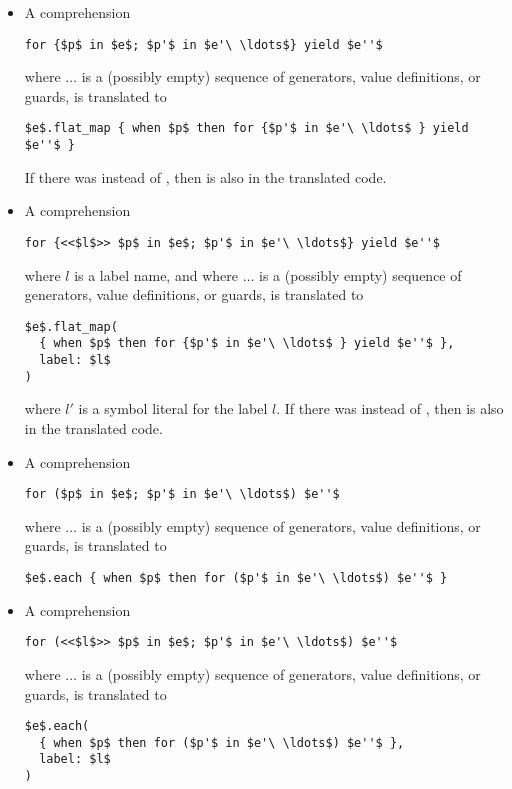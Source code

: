 \begin{itemize}
\item A comprehension 
\begin{lstlisting}
for {$p$ in $e$; $p'$ in $e'\ \ldots$} yield $e''$
\end{lstlisting}
where $\ldots$ is a (possibly empty) sequence of generators, value definitions, or guards, is translated to
\begin{lstlisting}
$e$.flat_map { when $p$ then for {$p'$ in $e'\ \ldots$ } yield $e''$ }
\end{lstlisting}
If there was  instead of , then  is also in the translated code. 

\item A comprehension 
\begin{lstlisting}
for {<<$l$>> $p$ in $e$; $p'$ in $e'\ \ldots$} yield $e''$
\end{lstlisting}
where $l$ is a label name, and where $\ldots$ is a (possibly empty) sequence of generators, value definitions, or guards, is translated to
\begin{lstlisting}[deletekeywords={label}]
$e$.flat_map(
  { when $p$ then for {$p'$ in $e'\ \ldots$ } yield $e''$ },
  label: $l$
)
\end{lstlisting}
where $l'$ is a symbol literal for the label $l$. If there was  instead of , then  is also in the translated code. 

\item A comprehension 
\begin{lstlisting}
for ($p$ in $e$; $p'$ in $e'\ \ldots$) $e''$
\end{lstlisting}
where $\ldots$ is a (possibly empty) sequence of generators, value definitions, or guards, is translated to
\begin{lstlisting}
$e$.each { when $p$ then for ($p'$ in $e'\ \ldots$) $e''$ }
\end{lstlisting}

\item A comprehension 
\begin{lstlisting}
for (<<$l$>> $p$ in $e$; $p'$ in $e'\ \ldots$) $e''$
\end{lstlisting}
where $\ldots$ is a (possibly empty) sequence of generators, value definitions, or guards, is translated to
\begin{lstlisting}[deletekeywords={label}]
$e$.each(
  { when $p$ then for ($p'$ in $e'\ \ldots$) $e''$ },
  label: $l$
)
\end{lstlisting}


\end{itemize}
